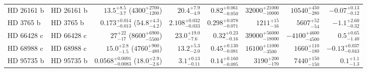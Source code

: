 \begin{longtable*}{llrrrrrr}
HD 26161 b & HD 26161 b & $13.5^{+8.5}_{-3.7}$ ($4300^{+2700}_{-1200}$) & $20.4^{+7.9}_{-4.9}$ & $0.82^{+0.061}_{-0.050}$ & $32000^{+21000}_{-10000}$ & $10540^{+450}_{-280}$ & $-0.07^{+0.13}_{-0.12}$ \\
HD 3765 b & HD 3765 b & $0.173^{+0.014}_{-0.013}$ ($54.8^{+4.3}_{-4.2}$) & $2.108^{+0.032}_{-0.033}$ & $0.298^{+0.078}_{-0.071}$ & $1211^{+15}_{-16}$ & $5607^{+52}_{-54}$ & $-1.1^{+2.60}_{-0.32}$ \\
HD 66428 c & HD 66428 c & $27^{+22}_{-17}$ ($8600^{+6900}_{-5500}$) & $23.0^{+19.0}_{-7.6}$ & $0.32^{+0.23}_{-0.16}$ & $39000^{+56000}_{-18000}$ & $-4100^{+4600}_{-4500}$ & $0.5^{+0.65}_{-1.40}$ \\
HD 68988 c & HD 68988 c & $15.0^{+2.8}_{-1.5}$ ($4760^{+900}_{-480}$) & $13.2^{+5.3}_{-2.0}$ & $0.45^{+0.130}_{-0.081}$ & $16100^{+11000}_{-3500}$ & $1660^{+110}_{-180}$ & $-0.13^{+0.037}_{-0.043}$ \\
HD 95735 b & HD 95735 b & $0.0568^{+0.0091}_{-0.0083}$ ($18.0^{+2.9}_{-2.6}$) & $3.1^{+0.13}_{-0.11}$ & $0.14^{+0.160}_{-0.095}$ & $3190^{+200}_{-170}$ & $7440^{+150}_{-150}$ & $0.1^{+1.1}_{-1.3}$ \\
\bottomrule
\end{longtable*}
